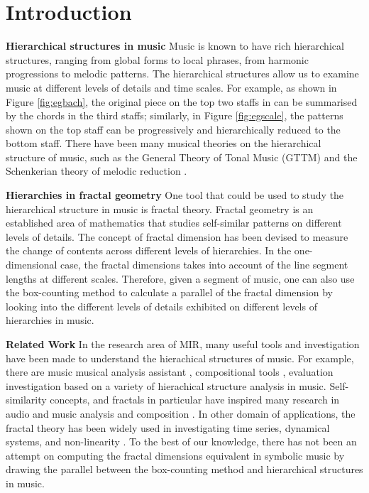 \newcommand{\victor}[1]{{\color{blue}\textbf{[victor:}\textit{#1}\textbf{]}}}
\newcommand{\iris}[1]{{\color{purple}\textbf{[iris:}\textit{#1}\textbf{]}}}
\newcommand{\dimbc}{\mathrm{dim}^{\mathrm{BC}}}

\section{Introduction}
\label{sec:intro}
\textbf{Hierarchical structures in music}
Music is known to have rich hierarchical structures, ranging from global forms to local phrases, from harmonic progressions to melodic patterns. 
The hierarchical structures allow us to examine music at different levels of details and time scales. 
For example, as shown in Figure \ref{fig:egbach}, the original piece on the top two staffs in can be summarised by the chords in the third staffs; 
similarly, in Figure \ref{fig:egscale}, the patterns shown on the top staff can be progressively and hierarchically reduced to the bottom staff. 
There have been many musical theories on the hierarchical structure of music, such as the General Theory of Tonal Music (GTTM) \cite{lerdahl1985generative} and the Schenkerian theory of melodic reduction \cite{forte1959schenker}.

\textbf{Hierarchies in fractal geometry}
One tool that could be used to study the hierarchical structure in music is fractal theory.
Fractal geometry is an established area of mathematics that studies self-similar patterns on different levels of details.
The concept of fractal dimension has been devised to measure the change of contents across different levels of hierarchies.
In the one-dimensional case, the fractal dimensions takes into account of the line segment lengths at different scales.
Therefore, given a segment of music, one can also use the box-counting method to calculate a parallel of the fractal dimension by looking into the different levels of details exhibited on different levels of hierarchies in music.

\textbf{Related Work}
In the research area of MIR, many useful tools and investigation have been made to understand the hierachical structures of music.
For example, there are music musical analysis assistant \cite{hamanaka2009interactive, hamanaka2005atta}, compositional tools \cite{hamanaka2004automatic, hamanaka2005automatic}, evaluation investigation \cite{mcfee2017evaluating, mcfee2015hierarchical} based on a variety of hierachical structure analysis in music.
Self-similarity concepts, and fractals in particular have inspired many research in audio and music analysis \cite{bigerelle2000fractal,hsu1990fractal,hsu1991self} and composition \cite{sukumaran2009generation,leach1995nature}.
In other domain of applications, the fractal theory has been widely used in investigating time series, dynamical systems, and non-linearity \cite{accardo1997use, higuchi1988approach}.
To the best of our knowledge, there has not been an attempt on computing the fractal dimensions equivalent in symbolic music by drawing the parallel between the box-counting method and hierarchical structures in music. 

